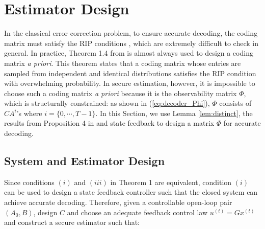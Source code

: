 \documentclass[../../thesis.tex]{subfiles}
\begin{document}
\section{Estimator Design}\label{sec:design}

In the classical error correction problem, to ensure accurate decoding, the coding matrix must satisfy the RIP conditions  \cite{tao11}, which are extremely difficult to check in general. In practice, Theorem 1.4 from\cite{tao11} is almost always used to design a coding matrix {\it a priori}. This theorem states that a coding matrix whose entries are sampled from independent and identical distributions satisfies the RIP condition with overwhelming probability. 
In secure estimation, however, it is impossible to choose such a coding matrix {\it a priori} because it is the observability matrix $\Phi$, which is structurally constrained: as shown in (\ref{eq:decoder_Phi}), $\Phi$ consists of $CA^{i}$'s where $i=\{0, \cdots, T-1\}$. In this Section, we use Lemma \ref{lem:distinct}, the results from Proposition 4 in \cite{Fawzi:2014} and state feedback to design a matrix $\Phi$ for accurate decoding. 
\subsection{System and Estimator Design}\label{sec:decoder_design}

Since conditions $(i)$ and $(iii)$ in Theorem 1 are equivalent, condition $(i)$ can be used to design a state feedback controller such that the closed system can achieve accurate decoding. Therefore, given a controllable open-loop pair $(A_0,B)$, design $C$ and choose an adequate feedback control law $u^{(t)} = G x^{(t)}$ and construct a secure estimator such that:
\end{document}
